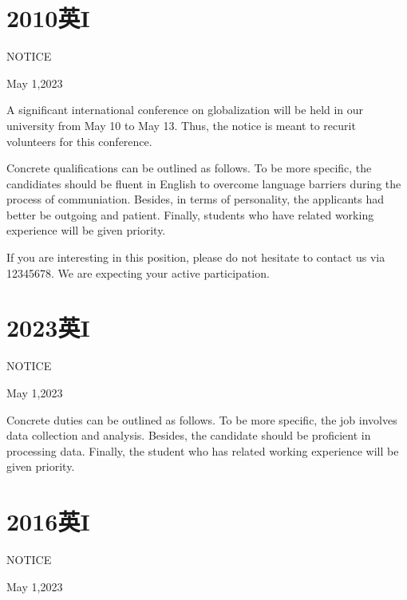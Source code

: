 \section{2010英I}

\begin{center}
    NOTICE

    \quad{}\quad{}
    \quad{}\quad{}
    \quad{}\quad{}
    May 1,2023
\end{center}

A significant international conference on globalization will be held in our university 
from May 10 to May 13. Thus, the notice is meant to recurit volunteers for this conference.

Concrete qualifications can be outlined as follows. To be more specific, the 
candidiates should be fluent in English to overcome language barriers during the 
process of communiation. Besides, in terms of personality, the applicants had better be 
outgoing and patient. Finally, students who have related working experience will be given priority.

If you are interesting in this position, please do not hesitate to contact us via 12345678.
We are expecting your active participation.


\section{2023英I}

\begin{center}
    NOTICE

    \quad{}\quad{}
    \quad{}\quad{}
    \quad{}\quad{}
    May 1,2023
\end{center}

Concrete duties can be outlined as follows. To be more specific, the job 
involves data collection and analysis. Besides, the candidate should be 
proficient in processing data. 
Finally, the student who has related working experience will be given priority.

\newpage

\section{2016英I}

\begin{center}
    NOTICE

    \quad{}\quad{}
    \quad{}\quad{}
    \quad{}\quad{}
    May 1,2023
\end{center}

